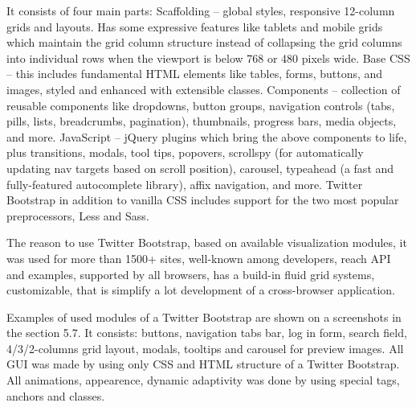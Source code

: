 	It consists of four main parts:
	Scaffolding – global styles, responsive 12-column grids and layouts. Has some expressive features like tablets and mobile grids which maintain the grid column structure instead of collapsing the grid columns into individual rows when the viewport is below 768 or 480 pixels wide. Base CSS – this includes fundamental HTML elements like tables, forms, buttons, and images, styled and enhanced with extensible classes. Components – collection of reusable components like dropdowns, button groups, navigation controls (tabs, pills, lists, breadcrumbs, pagination), thumbnails, progress bars, media objects, and more. JavaScript – jQuery plugins which bring the above components to life, plus transitions, modals, tool tips, popovers, scrollspy (for automatically updating nav targets based on scroll position), carousel, typeahead (a fast and fully-featured autocomplete library), affix navigation, and more. Twitter Bootstrap in addition to vanilla CSS includes support for the two most popular preprocessors, Less and Sass.
	

 The reason to use Twitter Bootstrap, based on available visualization modules, it was used for more than 1500+ sites, well-known among developers, reach API and examples, supported by all browsers, has a build-in fluid grid systems, customizable, that is simplify a lot development of a cross-browser application.

 Examples of used modules of a Twitter Bootstrap are shown on a screenshots in the section 5.7. It consists: buttons, navigation tabs bar, log in form, search field, 4/3/2-columns  grid layout, modals, tooltips and carousel for preview images. All GUI was made by using only CSS and HTML structure of a Twitter Bootstrap. All animations, appearence, dynamic adaptivity was done by using special tags, anchors and classes. 


